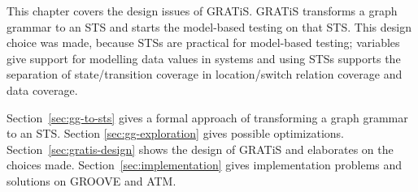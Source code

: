 This chapter covers the design issues of GRATiS. GRATiS transforms a graph grammar to an STS and starts the model-based testing on that STS. This design choice was made, because STSs are practical for model-based testing; variables give support for modelling data values in systems and using STSs supports the separation of state/transition coverage in location/switch relation coverage and data coverage.

Section~\ref{sec:gg-to-sts} gives a formal approach of transforming a graph grammar to an STS. Section \ref{sec:gg-exploration} gives possible optimizations. Section~\ref{sec:gratis-design} shows the design of GRATiS and elaborates on the choices made. Section~\ref{sec:implementation} gives implementation problems and solutions on GROOVE and ATM.
